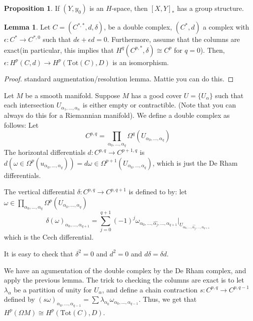 \documentclass{article}
\theoremstyle{definition}
\theoremstyle{definition}
\theoremstyle{definition}
\theoremstyle{definition}
\newtheorem{proposition}{Proposition}[theorem]
\theoremstyle{definition}
\newtheorem{lemma}[theorem]{Lemma}
\theoremstyle{definition}
\theoremstyle{definition}
\begin{document}
    
    \begin{tcolorbox}[colback=blue!5!white,colframe=blue!30!white]
    \begin{proposition}
    If $(Y,y_0)$ is an $H$-space, then $[X,Y]_*$ has a group structure. 
    \end{proposition}
    \end{tcolorbox}









\begin{tcolorbox}
\begin{lemma}
Let $C=(C^{*,*}, d,\delta)$, be a double complex, $(C^{*},d)$ a complex with $\epsilon: C^{*}\to C^{*,0}$ such that $d\epsilon+\epsilon d=0$. Furthermore, assume that the columns are exact(in particular, this implies that $H^q(C^{p,*}, \delta)\cong C^p$ for $q=0$). Then, $\epsilon: H^p(C,d)\to H^p(\textrm{Tot}(C),D)$ is an isomorphism.
\end{lemma}
\end{tcolorbox}
\begin{proof}
    standard augmentation/resolution lemma. Mattie you can do this. 
\end{proof}

Let $M$ be a smooth manifold. Suppose $M$ has a good cover $U=\{U_\alpha\}$ such that each intersection $U_{\alpha_1,...,\alpha_n}$ is either empty or contractible. (Note that you can always do this for a Riemannian manifold). We define a double complex as follows: Let 
\[C^{p,q}=\prod_{\alpha_0,...,\alpha_q}\Omega^q(U_{\alpha_0,...,\alpha_q})\]
The horizontal differentials $d: C^{p,q}\to C^{p+1,q}$ is $d(\omega\in \Omega^p(u_{\alpha_0,...,\alpha_q}))=d\omega\in \Omega^{p+1}(U_{\alpha_0,...,\alpha_q})$, which is just the De Rham differentials.

The vertical differential $\delta: C^{p,q}\to C^{p,q+1}$ is defined to by: let $\omega\in \prod_{\alpha_0,...,\alpha_q}\Omega^p(U_{\alpha_0,...,\alpha_q})$
\[\delta(\omega)_{\alpha_0,...,\alpha_{q+1}}=\sum_{j=0}^{q+1}(-1)^j\omega_{\alpha_0,...,\widehat{\alpha_j},...,\alpha_{q+1}}|_{U_{\alpha_0,...,\widehat{\alpha_j},...,\alpha_{q+1}}}\]
which is the Cech differential.

It is easy to check that $\delta^2=0$ and $d^2=0$ and $d\delta=\delta d$.

We have an agumentation of the double complex by the De Rham complex, and apply the previous lemma. The trick to checking the columns are exact is to let $\lambda_{\alpha}$ be a partition of unity for $U_{\alpha}$, and define a chain contraction $s: C^{p,q}\to C^{p,q-1}$ defined by $(s\omega)_{\alpha_0,...,\alpha_{q-1}}=\sum\lambda_{\alpha_0}\omega_{\alpha_0,...,\alpha_{q-1}}$. Thus, we get that $H^p(\Omega M)\cong H^p(\textrm{Tot}(C), D)$. 
\end{document}
